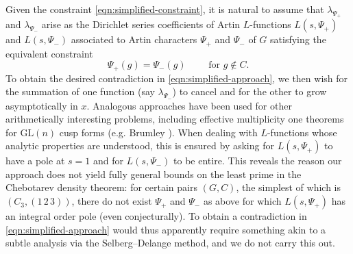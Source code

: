 \documentclass[12pt]{amsart}
\theoremstyle{definition} \newtheorem{definition}[theorem]{Definition}
\theoremstyle{example} \newtheorem{example}[theorem]{Example}
\theoremstyle{remark} \newtheorem{remark}{Remark}[theorem]
\numberwithin{equation}{section}
\numberwithin{theorem}{section}
\begin{document}
	 Given the constraint \eqref{eqn:simplified-constraint}, it is natural to assume that $\lambda_{\Psi_+}$ and $\lambda_{\Psi_-}$ arise as the Dirichlet series coefficients of Artin $L$-functions $L(s,\Psi_+)$ and $L(s,\Psi_-)$ associated to Artin characters $\Psi_+$ and $\Psi_-$ of $G$ satisfying the equivalent constraint 
	 \[
	 \Psi_+(g) = \Psi_-(g) \qquad \text{ for } g \not\in C. 
	 \] 
	To obtain the desired contradiction in \eqref{eqn:simplified-approach}, we then wish for the summation of one function (say $\lambda_{\Psi_-}$) to cancel and for the other to grow asymptotically in $x$. Analogous approaches have been used for other arithmetically interesting problems, including effective multiplicity one theorems for $\mathrm{GL}(n)$ cusp forms (e.g. Brumley \cite{Brumley-EffectiveMultiplicityOne}).  When dealing with $L$-functions whose analytic properties are understood, this is ensured by asking for $L(s,\Psi_+)$ to have a pole at $s=1$ and for $L(s,\Psi_-)$ to be entire.  This reveals the reason our approach does not yield fully general bounds on the least prime in the Chebotarev density theorem: for certain pairs $(G,C)$, the simplest of which is $(C_3, (1\,2\,3))$, there do not exist $\Psi_+$ and $\Psi_-$ as above for which $L(s,\Psi_+)$ has an integral order pole (even conjecturally). To obtain a contradiction in \eqref{eqn:simplified-approach} would thus apparently require something akin to a subtle analysis via the Selberg--Delange method, and we do not carry this out.
	
\end{document}

